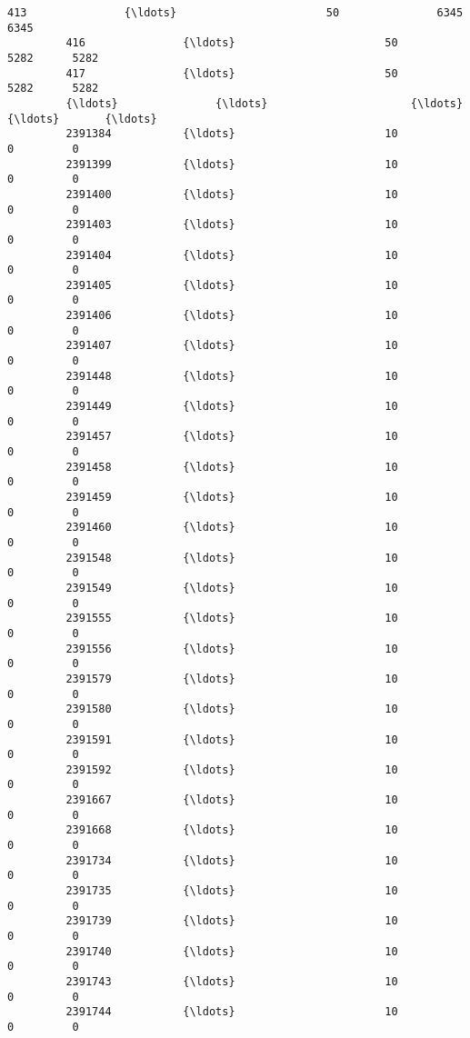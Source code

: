 \documentclass[11pt]{article}
\begin{document}
\begin{Verbatim}[commandchars=\\\{\}]
         413               {\ldots}                       50               6345      6345   
         416               {\ldots}                       50               5282      5282   
         417               {\ldots}                       50               5282      5282   
         {\ldots}               {\ldots}                      {\ldots}                {\ldots}       {\ldots}   
         2391384           {\ldots}                       10                  0         0   
         2391399           {\ldots}                       10                  0         0   
         2391400           {\ldots}                       10                  0         0   
         2391403           {\ldots}                       10                  0         0   
         2391404           {\ldots}                       10                  0         0   
         2391405           {\ldots}                       10                  0         0   
         2391406           {\ldots}                       10                  0         0   
         2391407           {\ldots}                       10                  0         0   
         2391448           {\ldots}                       10                  0         0   
         2391449           {\ldots}                       10                  0         0   
         2391457           {\ldots}                       10                  0         0   
         2391458           {\ldots}                       10                  0         0   
         2391459           {\ldots}                       10                  0         0   
         2391460           {\ldots}                       10                  0         0   
         2391548           {\ldots}                       10                  0         0   
         2391549           {\ldots}                       10                  0         0   
         2391555           {\ldots}                       10                  0         0   
         2391556           {\ldots}                       10                  0         0   
         2391579           {\ldots}                       10                  0         0   
         2391580           {\ldots}                       10                  0         0   
         2391591           {\ldots}                       10                  0         0   
         2391592           {\ldots}                       10                  0         0   
         2391667           {\ldots}                       10                  0         0   
         2391668           {\ldots}                       10                  0         0   
         2391734           {\ldots}                       10                  0         0   
         2391735           {\ldots}                       10                  0         0   
         2391739           {\ldots}                       10                  0         0   
         2391740           {\ldots}                       10                  0         0   
         2391743           {\ldots}                       10                  0         0   
         2391744           {\ldots}                       10                  0         0   
         

\end{Verbatim}
\end{document}
